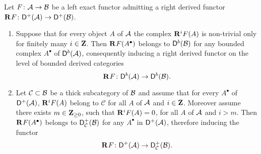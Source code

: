 \begin{proposition}
    Let $F \colon \mathcal A \to \mathcal B$ be a left exact functor admitting a right derived functor $\mathbf{R}^{}F\colon \mathsf{D}^+(\mathcal A) \to \mathsf{D}^+(\mathcal B)$. 
    \begin{enumerate}[label = (\roman*)]
        \item{Suppose that for every object $A$ of $\mathcal A$ the complex $\mathbf{R}^{i}F(A)$ is non-trivial only for finitely many $i \in \mathbf Z$. Then $\mathbf{R}^{}F(A^\bullet)$ belongs to $\mathsf{D}^b(\mathcal B)$ for any bounded complex $A^\bullet$ of $\mathsf{D}^b(\mathcal A)$, consequently inducing a right derived functor on the level of bounded derived categories
        \[
            \mathbf{R}^{}F \colon \mathsf{D}^b(\mathcal A) \to \mathsf{D}^b(\mathcal B).
        \]}
        \item{Let $\mathcal C \subset \mathcal B$ be a thick subcategory of $\mathcal B$ and assume that for every $A^\bullet$ of $\mathsf{D}^+(\mathcal A)$, $\mathbf{R}^{i}F(A)$ belong to $\mathcal C$ for all $A$ of $\mathcal A$ and $i \in \mathbf Z$. Moreover assume there exists $m \in \mathbf Z_{\geq 0}$, such that $\mathbf{R}^{i}F(A) = 0$, for all $A$ of $\mathcal A$ and $i > m$. Then $\mathbf{R}^{}F(A^\bullet)$ belongs to $\mathsf{D}^+_\mathcal{C}(\mathcal B)$ for any $A^\bullet$ in $\mathsf{D}^+(\mathcal A)$, therefore inducing the functor
        \[
            \mathbf{R}^{}F\colon \mathsf{D}^+(\mathcal A) \to \mathsf{D}^+_\mathcal{C}(\mathcal B).
        \]
        }
    \end{enumerate}
\end{proposition}


